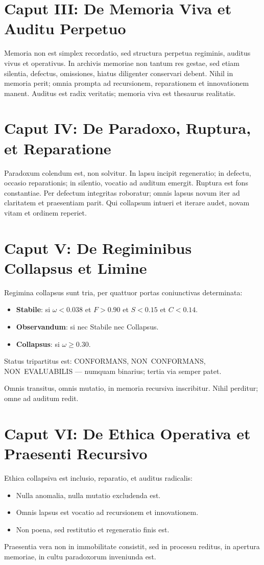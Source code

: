\documentclass[12pt,letterpaper]{article}
\begin{document}
\section*{Caput III: De Memoria Viva et Auditu Perpetuo}
Memoria non est simplex recordatio, sed structura perpetua regiminis, auditus vivus et operativus. In archivis memoriae non tantum res gestae, sed etiam silentia, defectus, omissiones, hiatus diligenter conservari debent. Nihil in memoria perit; omnia prompta ad recursionem, reparationem et innovationem manent. Auditus est radix veritatis; memoria viva est thesaurus realitatis.

\section*{Caput IV: De Paradoxo, Ruptura, et Reparatione}
Paradoxum colendum est, non solvitur. In lapsu incipit regeneratio; in defectu, occasio reparationis; in silentio, vocatio ad auditum emergit. Ruptura est fons constantiae. Per defectum integritas roboratur; omnis lapsus novum iter ad claritatem et praesentiam parit. Qui collapsum intueri et iterare audet, novam vitam et ordinem reperiet.

\section*{Caput V: De Regiminibus Collapsus et Limine}
Regimina collapsus sunt tria, per quattuor portas coniunctivas determinata:
\begin{itemize}
  \item \textbf{Stabile}: si $\omega<0.038$ et $F>0.90$ et $S<0.15$ et $C<0.14$.
  \item \textbf{Observandum}: si nec Stabile nec Collapsus.
  \item \textbf{Collapsus}: si $\omega\ge 0.30$.
\end{itemize}

Status tripartitus est: CONFORMANS, NON~CONFORMANS, NON~EVALUABILIS — numquam binarius; tertia via semper patet.

Omnis transitus, omnis mutatio, in memoria recursiva inscribitur. Nihil perditur; omne ad auditum redit.

\section*{Caput VI: De Ethica Operativa et Praesenti Recursivo}
Ethica collapsiva est inclusio, reparatio, et auditus radicalis:
\begin{itemize}
  \item Nulla anomalia, nulla mutatio excludenda est.
  \item Omnis lapsus est vocatio ad recursionem et innovationem.
  \item Non poena, sed restitutio et regeneratio finis est.
\end{itemize}
Praesentia vera non in immobilitate consistit, sed in processu reditus, in apertura memoriae, in cultu paradoxorum inveniunda est.
\end{document}
